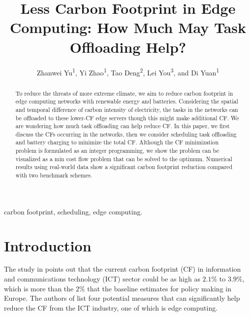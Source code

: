 \documentclass[conference, 10pt, ﬁnal, letterpaper, twocolumn]{IEEEtran}
\begin{document}
\title{Less Carbon Footprint in Edge Computing: How Much May Task Offloading Help?}
 
\author{Zhanwei Yu\textsuperscript{1}, Yi Zhao\textsuperscript{1}, Tao Deng\textsuperscript{2}, Lei You\textsuperscript{3}, and Di Yuan\textsuperscript{1}}


\renewcommand*{\Affilfont}{\small}

\maketitle

\begin{abstract}
To reduce the threats of more extreme climate, we aim to reduce carbon footprint in edge computing networks with renewable energy and batteries. Considering the spatial and temporal difference of carbon intensity of electricity, the tasks in the networks can be offloaded to these lower-CF edge servers though this might make additional CF. We are wondering how much task offloading can help reduce CF. In this paper, we first discuss the CFs occurring in the networks, then we consider scheduling task offloading and battery charging to minimize the total CF. Although the CF minimization problem is formulated as an integer programming, we show the problem can be visualized as a min cost flow problem that can be solved to the optimum. Numerical results using real-world data show a significant carbon footprint reduction compared with two benchmark schemes.
\end{abstract}

\begin{IEEEkeywords}
carbon footprint, scheduling, edge computing.
\end{IEEEkeywords}


\section{Introduction}
The study in \cite{https://doi.org/10.48550/arxiv.2102.02622} points out that the current carbon footprint (CF) in information and communications technology (ICT) sector could be as high as $2.1\%$ to $3.9\%$, which is more than the $2\%$ that the baseline estimates for policy making in Europe. The authors of \cite{perrons2021digital} list four potential measures that can significantly help reduce the CF from the ICT industry, one of which is edge computing. 
\end{document}
